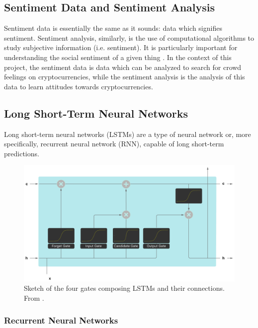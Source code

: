\documentclass[10pt,twocolumn]{article}
\begin{document}
\subsection{Sentiment Data and Sentiment Analysis}

Sentiment data is essentially the same as it sounds: data which signifies sentiment. Sentiment analysis, similarly, is the use of computational algorithms to study subjective information (i.e. sentiment). It is particularly important for understanding the social sentiment of a given thing \cite{SentimentAnalysisConcept}. In the context of this project, the sentiment data is data which can be analyzed to search for crowd feelings on cryptocurrencies, while the sentiment analysis is the analysis of this data to learn attitudes towards cryptocurrencies.

\subsection{Long Short-Term Neural Networks} \label{longshorttermneuralnetworks}

Long short-term neural networks (LSTMs) are a type of neural network or, more specifically, recurrent neural network (RNN), capable of long short-term predictions.

\begin{figure}
    \centering
    \includegraphics[scale=0.15]{images/four_layers.png}
    \caption{
        Sketch of the four gates composing LSTMs and their connections. From \textcite{apple}.
    }
    \label{lstm-four-layers}
\end{figure}

\subsubsection{Recurrent Neural Networks}
\end{document}
